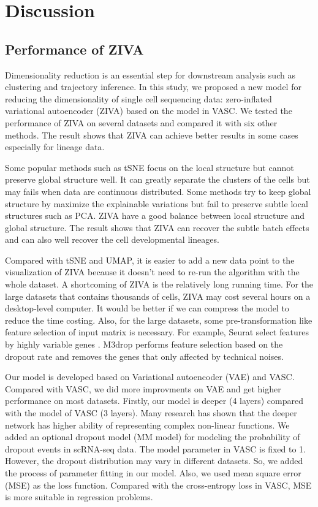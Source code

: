 \section{Discussion}
\subsection{Performance of ZIVA}
Dimensionality reduction is an essential step for downstream analysis such as clustering and trajectory inference. In this study, we proposed a new model for reducing the dimensionality of single cell sequencing data: zero-inflated variational autoencoder (ZIVA) based on the model in VASC. We tested the performance of ZIVA on several datasets and compared it with six other methods. The result shows that ZIVA can achieve better results in some cases especially for lineage data. 

Some popular methods such as tSNE focus on the local structure but cannot preserve global structure well. It can greatly separate the clusters of the cells but may fails when data are continuous distributed. Some methods try to keep global structure by maximize the explainable variations but fail to preserve subtle local structures such as PCA. ZIVA have a good balance between local structure and global structure. The result shows that ZIVA can recover the subtle batch effects and can also well recover the cell developmental lineages.

Compared with tSNE and UMAP, it is easier to add a new data point to the visualization of ZIVA because it doesn't need to re-run the algorithm with the whole dataset. A shortcoming of ZIVA is the relatively long running time. For the large datasets that contains thousands of cells, ZIVA may cost several hours on a desktop-level computer. It would be better if we can compress the model to reduce the time costing. Also, for the large datasets, some pre-transformation like feature selection of input matrix is necessary. For example, Seurat select features by highly variable genes \cite{Satija2015}. M3drop \cite{andrews2019m3drop} performs feature selection based on the dropout rate and removes the genes that only affected by technical noises.

Our model is developed based on Variational autoencoder (VAE) and VASC. Compared with VASC, we did more improvments on VAE and get higher performance on most datasets. Firstly, our model is deeper (4 layers) compared with the model of VASC (3 layers). Many research has shown that the deeper network has higher ability of representing complex non-linear functions. We added an optional dropout model (MM model) for modeling the probability of dropout events in scRNA-seq data. The model parameter in VASC is fixed to 1. However, the dropout distribution may vary in different datasets. So, we added the process of parameter fitting in our model. Also, we used mean square error (MSE) as the loss function. Compared with the cross-entropy loss in VASC, MSE is more suitable in regression problems. 

